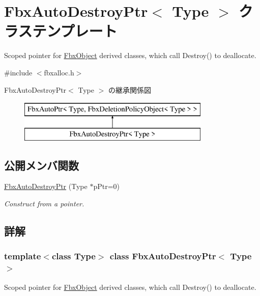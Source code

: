 \hypertarget{class_fbx_auto_destroy_ptr}{}\section{Fbx\+Auto\+Destroy\+Ptr$<$ Type $>$ クラステンプレート}
\label{class_fbx_auto_destroy_ptr}


Scoped pointer for \hyperlink{class_fbx_object}{Fbx\+Object} derived classes, which call Destroy() to deallocate.  




{\ttfamily \#include $<$fbxalloc.\+h$>$}

Fbx\+Auto\+Destroy\+Ptr$<$ Type $>$ の継承関係図\begin{figure}[H]
\begin{center}
\leavevmode
\includegraphics[height=2.000000cm]{class_fbx_auto_destroy_ptr}
\end{center}
\end{figure}
\subsection*{公開メンバ関数}
\begin{DoxyCompactItemize}
\item 
\hyperlink{class_fbx_auto_destroy_ptr_a7bf34add17eaf53502e326e1e5b0c977}{Fbx\+Auto\+Destroy\+Ptr} (Type $\ast$p\+Ptr=0)
\begin{DoxyCompactList}\small\item\em Construct from a pointer. \end{DoxyCompactList}\end{DoxyCompactItemize}


\subsection{詳解}
\subsubsection*{template$<$class Type$>$\newline
class Fbx\+Auto\+Destroy\+Ptr$<$ Type $>$}

Scoped pointer for \hyperlink{class_fbx_object}{Fbx\+Object} derived classes, which call Destroy() to deallocate. 

